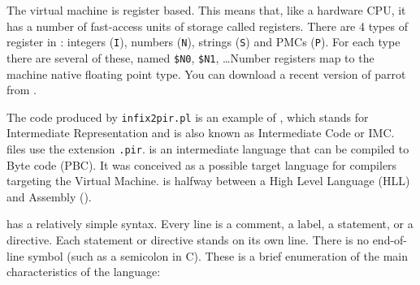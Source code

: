 The  virtual machine \cite{parrot} is register based. This means that, like a hardware
CPU, it has a number of fast-access units of storage called registers.
There are 4 types of register in : integers (\verb|I|), numbers (\verb|N|),
strings (\verb|S|) and PMCs (\verb|P|). For each type there are several of these, named
\verb|$N0|, \verb|$N1|, \ldots  Number registers map
to the machine native floating point type. 
You can download a recent version of parrot from
.

The code produced by \verb|infix2pir.pl| is an example of , which stands for 
 Intermediate Representation and is also known as
Intermediate Code or IMC.  files use the extension \verb|.pir|.
 is an intermediate language that can be compiled to
 Byte code (PBC). It was conceived as a possible target language for compilers
targeting the  Virtual Machine.  is halfway between a High
Level Language (HLL) and  Assembly ().

 has a relatively simple syntax. Every line is a comment, a
label, a statement, or a directive. Each statement or directive
stands on its own line. There is no end-of-line symbol (such as a
semicolon in C). These is a brief enumeration of the main characteristics of the language:

